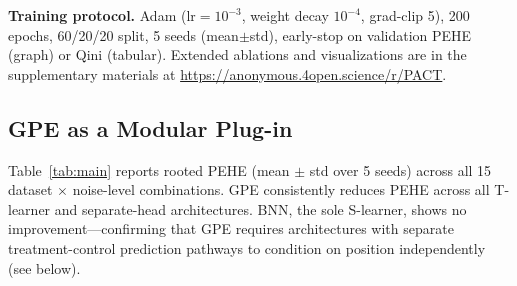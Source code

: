 \documentclass[sigconf,anonymous,review]{acmart}
\begin{document}
\textbf{Training protocol.} Adam ($\text{lr}{=}10^{-3}$, weight decay $10^{-4}$, grad-clip 5), 200 epochs, 60/20/20 split, 5 seeds (mean$\pm$std), early-stop on validation PEHE (graph) or Qini (tabular). Extended ablations and visualizations are in the supplementary materials at \url{https://anonymous.4open.science/r/PACT}.

\subsection{GPE as a Modular Plug-in}

Table~\ref{tab:main} reports rooted PEHE (mean $\pm$ std over 5 seeds) across all 15 dataset $\times$ noise-level combinations. GPE consistently reduces PEHE across all T-learner and separate-head architectures. BNN, the sole S-learner, shows no improvement---confirming that GPE requires architectures with separate treatment-control prediction pathways to condition on position independently (see below).
\end{document}
